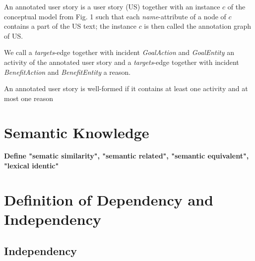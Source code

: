 \documentclass[a4paper, 11 pt, leqno, titlepage = true, toc=bib, oneside]{scrbook}
\begin{document}
\begin{defin} \cite{4}
    An annotated user story is a user story (US) together with an instance $c$ of the conceptual model from Fig. 1 such that each \textit{name}-attribute of a node of $c$ contains a part of the US text; the instance $c$ is then called the annotation graph of US.

    We call a \textit{targets}-edge together with incident \textit{GoalAction} and \textit{GoalEntity} an activity of the annotated user story and a \textit{targets}-edge together with incident \textit{BenefitAction} and \textit{BenefitEntity} a reason.
\end{defin}
\begin{defin} \cite{4}
    An annotated user story is well-formed if it contains at least one activity and at most one reason
\end{defin}




\section{Semantic Knowledge}


\textbf{Define "sematic similarity", "semantic related", "semantic equivalent", "lexical identic"}

\section{Definition of Dependency and Independency}
\subsection{Independency}
\end{document}
